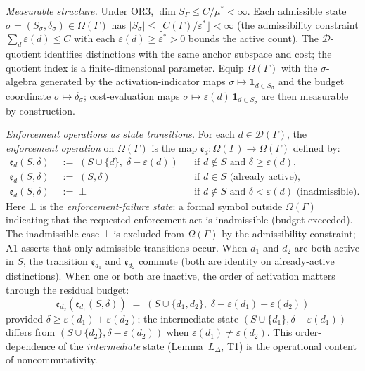 \documentclass[11pt]{article}
\theoremstyle{remark}
\begin{document}
\begin{tcolorbox}[defbox, title={$\mathrm{FD4}$ (State Space and Enforcement Cost)}]
\textit{Measurable structure.}  Under OR3, $\dim S_\Gamma \leq C/\mu^* < \infty$.  Each admissible state $\sigma = (S_\sigma, \delta_\sigma) \in \Omega(\Gamma)$ has $|S_\sigma| \leq \lfloor C(\Gamma)/\varepsilon^* \rfloor < \infty$ (the admissibility constraint $\sum_d \varepsilon(d) \le C$ with each $\varepsilon(d) \ge \varepsilon^* > 0$ bounds the active count).  The $\mathcal{D}$-quotient identifies distinctions with the same anchor subspace and cost; the quotient index is a finite-dimensional parameter.  Equip $\Omega(\Gamma)$ with the $\sigma$-algebra generated by the activation-indicator maps $\sigma \mapsto \mathbf{1}_{d \in S_\sigma}$ and the budget coordinate $\sigma \mapsto \delta_\sigma$; cost-evaluation maps $\sigma \mapsto \varepsilon(d)\,\mathbf{1}_{d \in S_\sigma}$ are then measurable by construction.

\smallskip\noindent\textit{Enforcement operations as state transitions.}
For each $d \in \mathcal{D}(\Gamma)$, the \emph{enforcement operation} on $\Omega(\Gamma)$ is the map $\mathfrak{e}_d: \Omega(\Gamma) \to \Omega(\Gamma)$ defined by:
\begin{align*}
\mathfrak{e}_d(S, \delta) &\;:=\; (S \cup \{d\},\; \delta - \varepsilon(d)) && \text{if } d \notin S \text{ and } \delta \ge \varepsilon(d), \\
\mathfrak{e}_d(S, \delta) &\;:=\; (S, \delta) && \text{if } d \in S \text{ (already active)}, \\
\mathfrak{e}_d(S, \delta) &\;:=\; \bot && \text{if } d \notin S \text{ and } \delta < \varepsilon(d) \text{ (inadmissible)}.
\end{align*}
Here $\bot$ is the \emph{enforcement-failure state}: a formal symbol outside $\Omega(\Gamma)$ indicating that the requested enforcement act is inadmissible (budget exceeded).  The inadmissible case $\bot$ is excluded from $\Omega(\Gamma)$ by the admissibility constraint; A1 asserts that only admissible transitions occur.  When $d_1$ and $d_2$ are both active in $S$, the transition $\mathfrak{e}_{d_1}$ and $\mathfrak{e}_{d_2}$ commute (both are identity on already-active distinctions).  When one or both are inactive, the order of activation matters through the residual budget:
\[
\mathfrak{e}_{d_2}(\mathfrak{e}_{d_1}(S, \delta)) \;=\; (S \cup \{d_1, d_2\},\; \delta - \varepsilon(d_1) - \varepsilon(d_2))
\]
provided $\delta \ge \varepsilon(d_1) + \varepsilon(d_2)$; the intermediate state $(S \cup \{d_1\}, \delta - \varepsilon(d_1))$ differs from $(S \cup \{d_2\}, \delta - \varepsilon(d_2))$ when $\varepsilon(d_1) \ne \varepsilon(d_2)$.  This order-dependence of the \emph{intermediate} state (Lemma~$L_\Delta$, T1) is the operational content of noncommutativity.


\end{tcolorbox}
\end{document}
